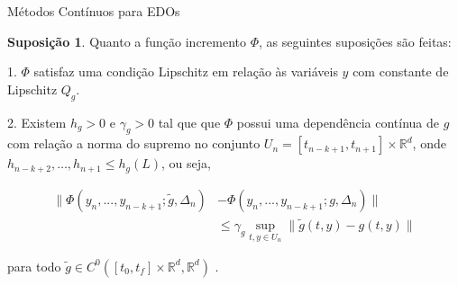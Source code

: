 \documentclass{beamer}
\newcommand{\R}{\mathbb{R}}
\theoremstyle{plain}
\theoremstyle{definition}
\newtheorem{assumption}{Suposição}
\begin{document}

\begin{frame}{Métodos Contínuos para EDOs}
    \begin{assumption}
        \label{chap3:assumption:1:Phi}
        \small
        Quanto a função incremento $\Phi$, as seguintes suposições são feitas:

        \phantom{aa} 1. $\Phi$ satisfaz uma condição Lipschitz em relação às variáveis $y$ com constante de Lipschitz $Q_g$.


        \phantom{aa} 2. Existem $h_g>0$ e $\gamma_g > 0$  tal que que $\Phi$ possui uma dependência contínua de $g$ com relação a norma do supremo no conjunto $U_n = [t_{n-k+1}, t_{n+1}] \times \R^d$, onde $h_{n - k +2 }, \dots, h_{n+1} \leq h_g (L)$, ou seja, 

        \scriptsize
            \begin{equation}
                \begin{split}
                    \| \Phi(y_n, ..., y_{n - k + 1}; \tilde{g}, \Delta_n)  &- \Phi(y_n, ..., y_{n - k + 1}; g, \Delta_n) \| \\
                                                                           &\leq \gamma_g \sup_{t, y \in U_n} \| \tilde{g}(t, y) - g(t, y) \|
                \end{split}
                \label{chap3:assumption:point_lipschitz}
            \end{equation}

        para todo $\tilde{g} \in C^0([t_0, t_f] \times \R^d, \R^d)$ . 

    \end{assumption}

\end{frame}



\end{document}
